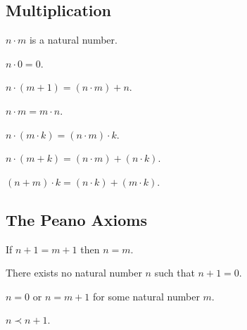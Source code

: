 \documentclass{article}
\begin{document}
\subsection{Multiplication}

\begin{forthel}
  \begin{signature}
    $n \cdot m$ is a natural number.
  \end{signature}

  \begin{axiom}
    $n \cdot 0 = 0$.
  \end{axiom}

  \begin{axiom}
    $n \cdot (m + 1) = (n \cdot m) + n$.
  \end{axiom}

  \begin{axiom}
    $n \cdot m = m \cdot n$.
  \end{axiom}

  \begin{axiom}
    $n \cdot (m \cdot k) = (n \cdot m) \cdot k$.
  \end{axiom}

  \begin{axiom}
    $n \cdot (m + k) = (n \cdot m) + (n \cdot k)$.
  \end{axiom}

  \begin{axiom}
    $(n + m) \cdot k = (n \cdot k) + (m \cdot k)$.
  \end{axiom}
\end{forthel}


\subsection{The Peano Axioms}

\begin{forthel}
  \begin{axiom}
    If $n + 1 =  m + 1$ then $n = m$.
  \end{axiom}

  \begin{axiom}
    There exists no natural number $n$ such that $n + 1 = 0$.
  \end{axiom}

  \begin{axiom}
    $n = 0$ or $n = m + 1$ for some natural number $m$.
  \end{axiom}

  \begin{axiom}
    $n \prec n + 1$.
  \end{axiom}
\end{forthel}
\end{document}
